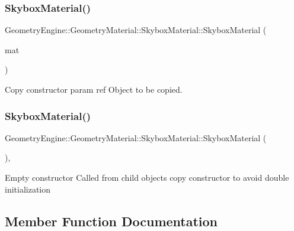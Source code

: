 \subsubsection{\texorpdfstring{SkyboxMaterial()}{SkyboxMaterial()}\hspace{0.1cm}{\footnotesize\ttfamily [2/3]}}
{\footnotesize\ttfamily Geometry\+Engine\+::\+Geometry\+Material\+::\+Skybox\+Material\+::\+Skybox\+Material (\begin{DoxyParamCaption}\item[{const \mbox{\hyperlink{class_geometry_engine_1_1_geometry_material_1_1_skybox_material}{Skybox\+Material}} \&}]{mat }\end{DoxyParamCaption})}

Copy constructor param ref Object to be copied. \mbox{\label{class_geometry_engine_1_1_geometry_material_1_1_skybox_material_ab2e9b5f4126857d70499480be0de286d}} 
\subsubsection{\texorpdfstring{SkyboxMaterial()}{SkyboxMaterial()}\hspace{0.1cm}{\footnotesize\ttfamily [3/3]}}
{\footnotesize\ttfamily Geometry\+Engine\+::\+Geometry\+Material\+::\+Skybox\+Material\+::\+Skybox\+Material (\begin{DoxyParamCaption}{ }\end{DoxyParamCaption})\hspace{0.3cm}{\ttfamily [inline]}, {\ttfamily [protected]}}

Empty constructor Called from child objects copy constructor to avoid double initialization 

\subsection{Member Function Documentation}
\mbox{\label{class_geometry_engine_1_1_geometry_material_1_1_skybox_material_ad1ec431a67d52440abfa24d66dbc12ca}} 

